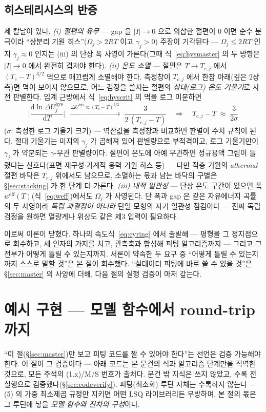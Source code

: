 \documentclass[11pt,a4paper]{article}
\newcommand{\dd}{\mathrm{d}}
\newcommand{\eff}{\mathrm{eff}}
\newcommand{\hys}{\mathrm{hys}}
\begin{document}
\subsection{히스테리시스의 반증}
세 칼날이 있다. \emph{(i) 절편의 유무} — gap 을 $|I|\to0$ 으로 외삽한 절편이 $0$ 이면 순수 분극이라 ``상분리 기원
히스''($\Omega_j>2RT$ 이고 $\gamma_j>0$) 주장이 기각된다 — $\Omega_j\le2RT$ 인지
$\gamma_j\approx0$ 인지는 (iii) 의 단상 폭 사영이 가른다(그때 식~\eqref{eq:hysmaster} 의 두 방향은
$|I|\to0$ 에서 완전히 겹쳐야 한다).
\emph{(ii) 온도 소멸} — 절편은 $T\to T_{c,j}$ 에서 $(T_c-T)^{3/2}$ 멱으로 매끄럽게 소멸해야 한다.
측정창이 $T_{c,j}$ 에서 한참 아래(깊은 2상측)면 멱이 보이지 않으므로, 어느 검정을 쓸지는 절편의
\emph{상대(로그) 온도 기울기}로 사전 판별한다. 임계 근방에서 식~\eqref{eq:hyscrit} 의 멱을 로그
미분하면
\begin{equation}
\bigg|\frac{\dd\ln\Delta U_j^\hys}{\dd T}\bigg|
\;\xrightarrow{\ \Delta U^\hys\propto(T_{c}-T)^{3/2}\ }\;
\frac{3}{2\,(T_{c,j}-T)}
\quad\Longrightarrow\quad
T_{c,j}-T\;\approx\;\frac{3}{2\sigma}
\label{eq:logslopeT}
\end{equation}
($\sigma$: 측정한 로그 기울기 크기) — 역산값을 측정창과 비교하면 판별이 수치 규칙이 된다. 절대 기울기는 미지의 $\gamma_j$ 가 곱해져 있어 판별량으로 부적격이고, 로그 기울기만이
$\gamma_j$ 가 약분되는 $\gamma$-무관 판별량이다. 절편이 온도에 아예 무관하면 정규용액 그림이 틀렸다는
신호다(표면 재구성$\cdot$기계적 응력 기원 히스 등) — 다만 적층 기원의 \emph{athermal} 절편 바닥은
$T_{c,j}$ 위에서도 남으므로, 소멸하는 몫과 남는 바닥의 구별은 \S\ref{sec:stacking} 가 한 단계 더 가른다.
\emph{(iii) 내적 일관성} — 단상 온도 구간이 있으면
폭 $w^{\eff}(T)$(식~\eqref{eq:weff})에서도 $\Omega_j$ 가 사영된다. 단 폭과 gap 은 같은 자유에너지
곡률의 두 사영이라 \emph{독립 과결정이 아니라} 단일 모형의 자기 일관성 점검이다 — 진짜 독립 검정을
원하면 열량계나 위상도 같은 제3 입력이 필요하다.

\medskip
이로써 이론이 닫혔다. 하나의 속도식~\eqref{eq:eyring} 에서 출발해 — 평형을 그 정지점으로 회수하고, 세
인자의 가지를 치고, 관측축과 합성해 피팅 알고리즘까지 — 그리고 그 전부가 어떻게 틀릴 수 있는지까지.
서론이 약속한 두 요구 중 ``어떻게 틀릴 수 있는지까지 스스로 말할 것''은 본 절이 회수했다. ``실데이터 피팅에 바로 쓸 수
있을 것''은 \S\ref{sec:master} 의 사양에 더해, 다음 절의 실행 검증이 마저 갚는다.

\section{예시 구현 — 모델 함수에서 round-trip 까지}\label{sec:code}
``이 절(\S\ref{sec:master})만 보고 피팅 코드를 짤 수 있어야 한다''는 선언은 검증 가능해야 한다. 이
절이 그 검증이다 — 아래 코드는 본 문건의 식과 알고리즘 단계만을 직역한 것으로, 모든 주석의 (1.x)/M/S
번호가 출처다. 문건 밖 지식은 쓰지 않았고, 수록 전 실행으로 검증했다(\S\ref{sec:codeverify}).
피팅(최소화) 루틴 자체는 수록하지 않는다 — (5) 의 가중 최소제곱 규정만 지키면 어떤 LSQ 라이브러리든
무방하며, 본 절의 몫은 그 루틴에 넣을 \emph{모델 함수와 잔차의 구성}이다.
\end{document}
